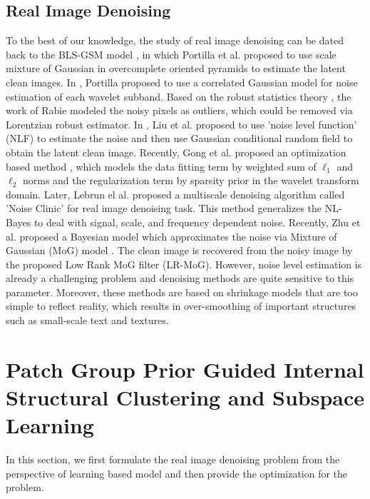 \documentclass[10pt,twocolumn,letterpaper]{article}
\begin{document}
\subsection{Real Image Denoising}
To the best of our knowledge, the study of real image denoising can be dated back to the BLS-GSM model \cite{blsgsm}, in which Portilla et al. proposed to use scale mixture of Gaussian in overcomplete oriented pyramids to estimate the latent clean images. In \cite{fullyblind}, Portilla proposed to use a correlated Gaussian model for noise estimation of each wavelet subband. Based on the robust statistics theory \cite{huber2011robust}, the work of Rabie \cite{rabie2005robust} modeled the noisy pixels as outliers, which could be removed via Lorentzian robust estimator. In \cite{Liu2008}, Liu et al. proposed to use 'noise level function' (NLF) to estimate the noise and then use Gaussian conditional random field to obtain the latent clean image. Recently, Gong et al. proposed an optimization based method \cite{almapg}, which models the data fitting term by weighted sum of $\ell_{1}$ and $\ell_{2}$ norms and the regularization term by sparsity prior in the wavelet transform domain. Later, Lebrun el al. proposed a multiscale denoising algorithm called 'Noise Clinic' \cite{noiseclinic} for real image denoising task. This method generalizes the NL-Bayes \cite{nlbayes} to deal with signal, scale, and frequency dependent noise. Recently, Zhu et al. proposed a Bayesian model \cite{Zhu_2016_CVPR} which approximates the noise via Mixture of Gaussian (MoG) model \cite{Bishop}. The clean image is recovered from the noisy image by the proposed Low Rank MoG filter (LR-MoG). However, noise level estimation is already a challenging problem and denoising methods are quite sensitive to this parameter. Moreover, these methods are based on shrinkage models that are too simple to reflect reality, which results in over-smoothing of important structures such as small-scale text and textures. 

\section{Patch Group Prior Guided Internal Structural Clustering and Subspace Learning}
In this section, we first formulate the real image denoising problem from the perspective of learning based model and then provide the optimization for the problem.
\end{document}
